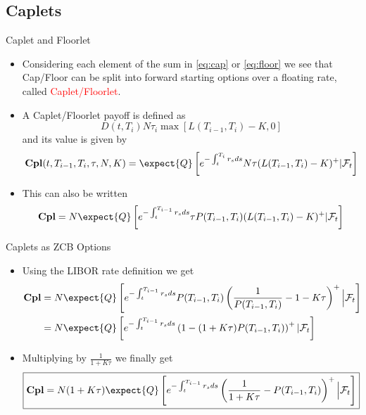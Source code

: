 \documentclass{beamer}
\begin{document}
\subsection{Caplets}
\begin{frame}{Caplet and Floorlet}
	\begin{itemize}
		\item<1-> Considering each element of the sum in \cref{eq:cap} or \cref{eq:floor} we see that Cap/Floor can be split into forward starting options over a floating rate, called \textcolor{red}{Caplet/Floorlet}.
		\item<2-> A Caplet/Floorlet payoff is defined as
		\begin{equation*}
			D(t,T_i)N\tau_i\max\left[L(T_{i-1},T_i)-K,0\right]
		\end{equation*} 
		and its value is given by
		\begin{equation}
			\textbf{Cpl}(t,T_{i-1},T_i,\tau,N,K)=\expect{Q}\left[e^{-\int_t^{T_i}r_s ds}N\tau(L(T_{i-1},T_i)-K)^+ | \mathcal{F}_t\right]
		\end{equation}
		\item<3-> This can also be written
		\begin{equation*}
			\textbf{Cpl}=N\expect{Q}\left[e^{-\int_t^{T_{i-1}}r_s ds}\tau P(T_{i-1},T_i)(L(T_{i-1},T_i)-K)^+ | \mathcal{F}_t\right]
		\end{equation*}
	\end{itemize}
\end{frame}

\begin{frame}{Caplets as ZCB Options}
	\begin{itemize}
		\item<1-> Using the LIBOR rate definition we get
		\begin{equation*}
			\begin{aligned}
				\textbf{Cpl} &=N\expect{Q}\left[e^{-\int_t^{T_{i-1}}r_s ds}P(T_{i-1},T_i)\left(\frac{1}{P(T_{i-1},T_i)}-1-K\tau\right)^+ \Big\rvert \mathcal{F}_t\right] \\
				& = N\expect{Q}\left[e^{-\int_t^{T_{i-1}}r_s ds}\left(1-(1+K\tau)P(T_{i-1},T_i)\right)^+ | \mathcal{F}_t\right]
			\end{aligned}
		\end{equation*}
		\item<2-> Multiplying by $\frac{1}{1+K\tau}$ we finally get
		\begin{equation}
			\boxed{\textbf{Cpl}=N(1+K\tau)\expect{Q}\left[e^{-\int_t^{T_{i-1}}r_s ds}\left(\frac{1}{1+K\tau}-P(T_{i-1},T_i)\right)^+ \Big\rvert \mathcal{F}_t\right]}
		\end{equation}
	\end{itemize}
\end{frame}
\end{document}
